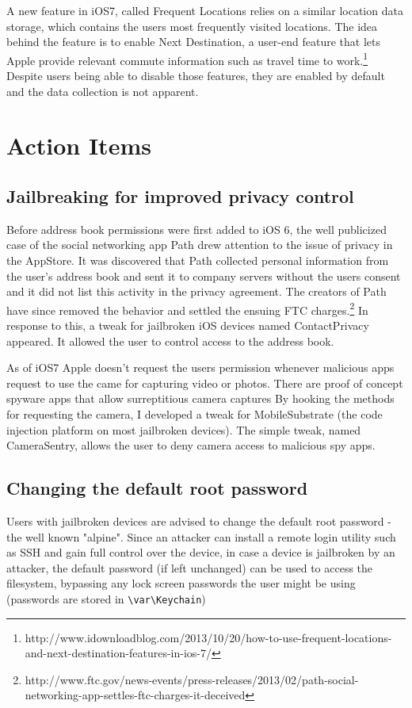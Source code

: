 \documentclass[12pt, titlepage, oneside]{article}
\begin{document}
A new feature in iOS7, called Frequent Locations relies on a similar location data storage, which contains the users most frequently visited locations. The idea behind the feature is to enable Next Destination, a user-end feature that lets Apple provide relevant commute information such as travel time to work.\footnote{http://www.idownloadblog.com/2013/10/20/how-to-use-frequent-locations-and-next-destination-features-in-ios-7/} Despite users being able to disable those features, they are enabled by default and the data collection is not apparent.

\section{Action Items}
\subsection{Jailbreaking for improved privacy control}

Before address book permissions were first added to iOS 6, the well publicized case of the social networking app Path drew attention to the issue of privacy in the AppStore. It was discovered that Path collected personal information from the user's address book and sent it to company servers without the users consent and it did not list this activity in the privacy agreement. The creators of Path have since removed the behavior and settled the ensuing FTC charges.\footnote{http://www.ftc.gov/news-events/press-releases/2013/02/path-social-networking-app-settles-ftc-charges-it-deceived} In response to this, a tweak for jailbroken iOS devices named ContactPrivacy appeared. It allowed the user to control access to the address book.

As of iOS7 Apple doesn't request the users permission whenever malicious apps request to use the came for capturing video or photos. There are proof of concept spyware apps that allow surreptitious camera captures\cite{espionage} By hooking the methods for requesting the camera, I developed a tweak for MobileSubstrate (the code injection platform on most jailbroken devices). The simple tweak, named CameraSentry, allows the user to deny camera access to malicious spy apps. 

\subsection{Changing the default root password}

Users with jailbroken devices are advised to change the default root password - the well known "alpine". Since an attacker can install a remote login utility such as SSH and gain full control over the device, in case a device is jailbroken by an attacker, the default password (if left unchanged) can be used to access the filesystem, bypassing any lock screen passwords the user might be using (passwords are stored in \texttt{{\textbackslash}var{\textbackslash}Keychain})\cite{lostpass}
\end{document}
